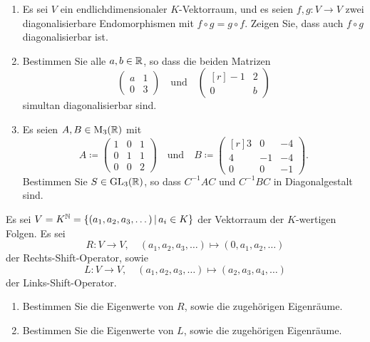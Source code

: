 \documentclass[a4paper, 10pt]{scrartcl}
\begin{document}
\begin{question}[subtitle = Simultane Diagonalisierbarkeit]
  \begin{enumerate}
    \item
      Es sei $V$ ein endlichdimensionaler $K$-Vektorraum, und es seien $f, g \colon V \to V$ zwei diagonalisierbare Endomorphismen mit $f \circ g = g \circ f$.
      Zeigen Sie, dass auch $f \circ g$ diagonalisierbar ist.
    \item
      Bestimmen Sie alle $a, b \in \mathbb{R}$, so dass die beiden Matrizen
      \[
        \begin{pmatrix}
          a & 1 \\
          0 & 3
        \end{pmatrix}
        \quad\text{und}\quad
        \begin{pmatrix*}[r]
          -1  & 2 \\
          0  & b
        \end{pmatrix*}
      \]
      simultan diagonalisierbar sind.
      
    \item
      Es seien $A, B \in \operatorname{M}_{3}(\mathbb{R})$ mit
      \[
                  A
        \coloneqq \begin{pmatrix}
                    1  & 0  & 1 \\
                    0  & 1  & 1 \\
                    0  & 0  & 2
                  \end{pmatrix}
        \quad \text{und} \quad
                  B
        \coloneqq \begin{pmatrix*}[r]
                    3 &  0  & -4  \\
                    4 & -1  & -4  \\
                    0 &  0  & -1
                  \end{pmatrix*}.
      \]
      Bestimmen Sie $S \in \operatorname{GL}_{3}(\mathbb{R})$, so dass $C^{-1} A C$ und $C^{-1} B C$ in Diagonalgestalt sind.
  \end{enumerate}
\end{question}





\begin{question}[subtitle = Links- und Rechtsshift]
  Es sei $V = K^{\mathbb{N}} = \{(a_1, a_2, a_3, \dotsc) \,|\, a_i \in K\}$ der Vektorraum der $K$-wertigen Folgen.
  Es sei
  \[
            R
    \colon  V
    \to     V,
    \quad   (a_1, a_2, a_3, \dotsc)
    \mapsto (0,   a_1, a_2, \dotsc)
  \]
  der Rechts-Shift-Operator, sowie
  \[
            L
    \colon  V
    \to     V,
    \quad   (a_1, a_2, a_3, \dotsc)
    \mapsto (a_2, a_3, a_4, \dotsc)
  \]
  der Links-Shift-Operator.
  \begin{enumerate}
    \item
      Bestimmen Sie die Eigenwerte von $R$, sowie die zugehörigen Eigenräume.
    \item
      Bestimmen Sie die Eigenwerte von $L$, sowie die zugehörigen Eigenräume.
  \end{enumerate}
\end{question}
\end{document}
